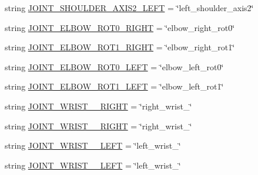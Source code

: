 \begin{DoxyCompactItemize}
\item 
string \mbox{\hyperlink{namespacesteering__trajectory__test_aa9cfdc8e1e99fc16ad7ba54711223bde}{J\+O\+I\+N\+T\+\_\+\+S\+H\+O\+U\+L\+D\+E\+R\+\_\+\+A\+X\+I\+S2\+\_\+\+L\+E\+FT}} = \char`\"{}left\+\_\+shoulder\+\_\+axis2\char`\"{}
\item 
string \mbox{\hyperlink{namespacesteering__trajectory__test_abb189cf49da2ca7444211055fce8edd0}{J\+O\+I\+N\+T\+\_\+\+E\+L\+B\+O\+W\+\_\+\+R\+O\+T0\+\_\+\+R\+I\+G\+HT}} = \char`\"{}elbow\+\_\+right\+\_\+rot0\char`\"{}
\item 
string \mbox{\hyperlink{namespacesteering__trajectory__test_ab511e0faa8c9f2c1a6511c7efbb528e0}{J\+O\+I\+N\+T\+\_\+\+E\+L\+B\+O\+W\+\_\+\+R\+O\+T1\+\_\+\+R\+I\+G\+HT}} = \char`\"{}elbow\+\_\+right\+\_\+rot1\char`\"{}
\item 
string \mbox{\hyperlink{namespacesteering__trajectory__test_a27e4f3f6a2628a532863b0c6ce64127b}{J\+O\+I\+N\+T\+\_\+\+E\+L\+B\+O\+W\+\_\+\+R\+O\+T0\+\_\+\+L\+E\+FT}} = \char`\"{}elbow\+\_\+left\+\_\+rot0\char`\"{}
\item 
string \mbox{\hyperlink{namespacesteering__trajectory__test_aec6cc059672d80d99d6ad4501ae5ad05}{J\+O\+I\+N\+T\+\_\+\+E\+L\+B\+O\+W\+\_\+\+R\+O\+T1\+\_\+\+L\+E\+FT}} = \char`\"{}elbow\+\_\+left\+\_\+rot1\char`\"{}
\item 
string \mbox{\hyperlink{namespacesteering__trajectory__test_ad89d903f545e6828b9b56ffb9b179ade}{J\+O\+I\+N\+T\+\_\+\+W\+R\+I\+S\+T\+\_\+\_\+\+R\+I\+G\+HT}} = \char`\"{}right\+\_\+wrist\+\_\char`\"{}
\item 
string \mbox{\hyperlink{namespacesteering__trajectory__test_adc8e2b5ada42f3f13048e5c1a809e374}{J\+O\+I\+N\+T\+\_\+\+W\+R\+I\+S\+T\+\_\+\_\+\+R\+I\+G\+HT}} = \char`\"{}right\+\_\+wrist\+\_\char`\"{}
\item 
string \mbox{\hyperlink{namespacesteering__trajectory__test_a733ace260ab22f39fef902c7f16da974}{J\+O\+I\+N\+T\+\_\+\+W\+R\+I\+S\+T\+\_\+\_\+\+L\+E\+FT}} = \char`\"{}left\+\_\+wrist\+\_\char`\"{}
\item 
string \mbox{\hyperlink{namespacesteering__trajectory__test_ac92f853b9227fafe6c2beeb1748c10ca}{J\+O\+I\+N\+T\+\_\+\+W\+R\+I\+S\+T\+\_\+\_\+\+L\+E\+FT}} = \char`\"{}left\+\_\+wrist\+\_\char`\"{}
\item 

\end{DoxyCompactItemize}
